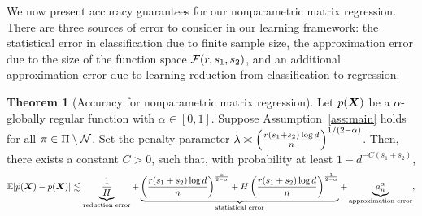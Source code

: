 \documentclass[11pt]{article}
\newcommand*{\KeepStyleUnderBrace}[1]{%
\mathop{%
\mathchoice
{\underbrace{\displaystyle#1}}%
{\underbrace{\textstyle#1}}%
{\underbrace{\scriptstyle#1}}%
{\underbrace{\scriptscriptstyle#1}}%
}\limits
}
\theoremstyle{definition}
\newtheorem{thm}{Theorem}[section]
\newtheorem{corollary}{Corollary}[section]
\def\fixme#1#2{\textbf{\color{red}[FIXME (#1): #2]}}
\def\bayesS{S_{\textup{bayes}}}
\begin{document}



We now present accuracy guarantees for our nonparametric matrix regression.  There are three sources of error to consider in our learning framework: the statistical error in classification due to finite sample size, the approximation error due to the size of the function space $\mathcal{F}(r,s_1,s_2)$, and an additional approximation error due to learning reduction from classification to regression.

\begin{thm}[Accuracy for nonparametric matrix regression]\label{thm:regression} Let $p(\bm X)$ be a $\alpha$-globally regular function with $\alpha\in[0,1]$. 
Suppose Assumption~\ref{ass:main} holds for all $\pi\in\Pi\setminus \mathcal{N}$. Set the penalty parameter $\lambda\asymp \left( r(s_1+s_2)\log d \over n\right)^{1/(2-\alpha)}$. Then, there exists a constant $C>0$, such that, with probability at least $1-d^{-C(s_1+s_2)}$,
\[
\mathbb{E}|\hat p(\mX)- p(\mX)| \lesssim \KeepStyleUnderBrace{{1\over H}}_{\text{reduction error}} +\KeepStyleUnderBrace{
\left({r(s_1+s_2)\log d\over n}\right)^{\alpha\over 2-\alpha}+H\left({r(s_1+s_2)\log d\over n}\right)^{1\over 2-\alpha}}_{\text{statistical error}} + \KeepStyleUnderBrace{a^\alpha_n}_{\text{approximation error}},
\]
\end{thm}
\end{document}
